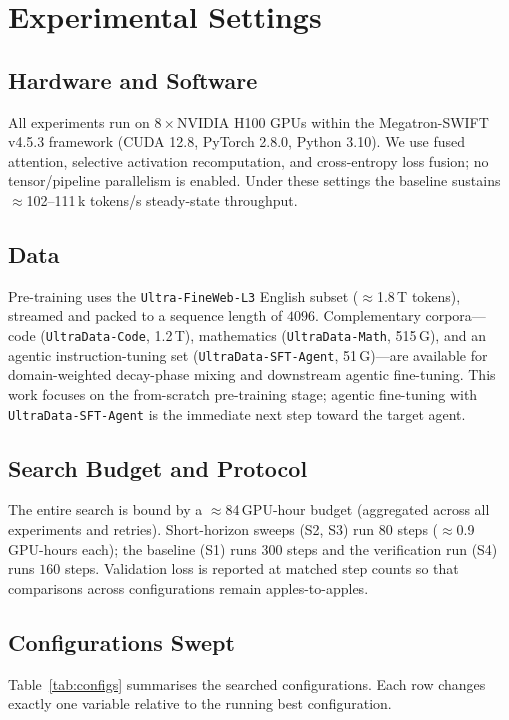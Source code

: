 \section{Experimental Settings}

\subsection{Hardware and Software}
All experiments run on $8\times$NVIDIA H100 GPUs within the Megatron-SWIFT v4.5.3 framework (CUDA 12.8, PyTorch 2.8.0, Python 3.10).
We use fused attention, selective activation recomputation, and cross-entropy loss fusion; no tensor/pipeline parallelism is enabled.
Under these settings the baseline sustains $\approx$102--111\,k tokens/s steady-state throughput.

\subsection{Data}
Pre-training uses the \texttt{Ultra-FineWeb-L3} English subset ($\approx$1.8\,T tokens), streamed and packed to a sequence length of $4096$.
Complementary corpora---code (\texttt{UltraData-Code}, 1.2\,T), mathematics (\texttt{UltraData-Math}, 515\,G), and an agentic instruction-tuning set (\texttt{UltraData-SFT-Agent}, 51\,G)---are available for domain-weighted decay-phase mixing and downstream agentic fine-tuning.
This work focuses on the from-scratch pre-training stage; agentic fine-tuning with \texttt{UltraData-SFT-Agent} is the immediate next step toward the target agent.

\subsection{Search Budget and Protocol}
The entire search is bound by a $\approx$84\,GPU-hour budget (aggregated across all experiments and retries).
Short-horizon sweeps (S2, S3) run $80$ steps ($\approx$0.9\,GPU-hours each); the baseline (S1) runs $300$ steps and the verification run (S4) runs $160$ steps.
Validation loss is reported at matched step counts so that comparisons across configurations remain apples-to-apples.

\subsection{Configurations Swept}
Table~\ref{tab:configs} summarises the searched configurations.
Each row changes exactly one variable relative to the running best configuration.